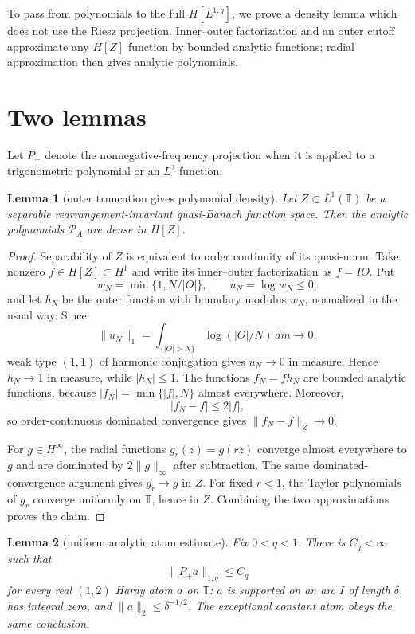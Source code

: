 \documentclass[11pt]{article}
\newtheorem{lemma}{Lemma}
\newcommand{\T}{\mathbb T}
\newcommand{\PA}{\mathcal P_A}
\begin{document}
To pass from polynomials to the full $H[L^{1,q}]$, we prove a density lemma
which does not use the Riesz projection.  Inner--outer factorization and an
outer cutoff approximate any $H[Z]$ function by bounded analytic functions;
radial approximation then gives analytic polynomials.

\section*{Two lemmas}

Let $P_+$ denote the nonnegative-frequency projection when it is applied to
a trigonometric polynomial or an $L^2$ function.

\begin{lemma}[outer truncation gives polynomial density]\label{lem:density}
Let $Z\subset L^1(\T)$ be a separable rearrangement-invariant quasi-Banach
function space.  Then the analytic polynomials $\PA$ are dense in $H[Z]$.
\end{lemma}

\begin{proof}
Separability of $Z$ is equivalent to order continuity of its quasi-norm.
Take nonzero $f\in H[Z]\subset H^1$ and write its inner--outer
factorization as $f=IO$.  Put
\[
 w_N=\min\{1,N/|O|\},\qquad u_N=\log w_N\le0,
\]
and let $h_N$ be the outer function with boundary modulus $w_N$, normalized
in the usual way.  Since
\[
 \|u_N\|_1
 =\int_{\{|O|>N\}}\log(|O|/N)\,dm\longrightarrow0,
\]
weak type $(1,1)$ of harmonic conjugation gives
$\widetilde u_N\to0$ in measure.  Hence $h_N\to1$ in measure, while
$|h_N|\le1$.  The functions $f_N=fh_N$ are bounded analytic functions,
because $|f_N|=\min\{|f|,N\}$ almost everywhere.  Moreover,
\[
 |f_N-f|\le2|f|,
\]
so order-continuous dominated convergence gives $\|f_N-f\|_Z\to0$.

For $g\in H^\infty$, the radial functions $g_r(z)=g(rz)$ converge almost
everywhere to $g$ and are dominated by $2\|g\|_\infty$ after subtraction.
The same dominated-convergence argument gives $g_r\to g$ in $Z$.  For fixed
$r<1$, the Taylor polynomials of $g_r$ converge uniformly on $\T$, hence in
$Z$.  Combining the two approximations proves the claim.
\end{proof}

\begin{lemma}[uniform analytic atom estimate]\label{lem:atom}
Fix $0<q<1$.  There is $C_q<\infty$ such that
\begin{equation}\label{eq:atomnorm}
 \|P_+a\|_{1,q}\le C_q
\end{equation}
for every real $(1,2)$ Hardy atom $a$ on $\T$: $a$ is supported on an arc
$I$ of length $\delta$, has integral zero, and
$\|a\|_2\le\delta^{-1/2}$.  The exceptional constant atom obeys the same
conclusion.
\end{lemma}
\end{document}
